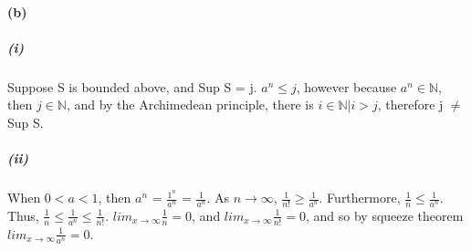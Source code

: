 \documentclass[10pt,letter]{article}
\begin{document}
\paragraph{(b)} 
\subparagraph{(i)}
Suppose S is bounded above, and Sup S = j. $a^n \leq j$, however because $a^n \in \mathbb{N}$, then $j \in \mathbb{N}$, and by the Archimedean principle, there is $i \in \mathbb{N} | i > j$, therefore j $\neq$ Sup S. 

\subparagraph{(ii)}
When $0 < a < 1$, then $a^n$ = $\frac{1^n}{a^n}$ = $\frac{1}{a^n}$. As $n \rightarrow \infty$, $\frac{1}{n!} \geq \frac{1}{a^n}$. Furthermore, $\frac{1}{n} \leq \frac{1}{a^n}$. Thus, $\frac{1}{n} \leq \frac{1}{a^n} \leq \frac{1}{n!}$. $lim_{x\rightarrow\infty} \frac{1}{n} = 0$, and $lim_{x\rightarrow\infty} \frac{1}{n!} = 0$, and so by squeeze theorem $lim_{x\rightarrow\infty} \frac{1}{a^n} = 0$. 
\end{document}
